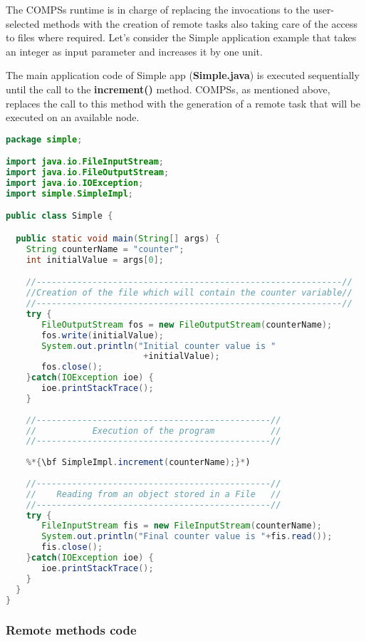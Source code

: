 The COMPSs runtime is in charge of replacing the invocations to the user-selected methods with the
creation of remote tasks also taking care of the access to files where required. 
Let's consider the Simple application example that takes an integer as input parameter and increases it by one unit.

The main application code of Simple app ({\bf Simple.java}) is executed sequentially until the call to the
{\bf increment()} method. COMPSs, as mentioned above, replaces the call to this method with the generation of a remote task that will be executed on an available node.

\begin{lstlisting}[language=java]
package simple;

import java.io.FileInputStream;
import java.io.FileOutputStream;
import java.io.IOException;
import simple.SimpleImpl;

public class Simple {

  public static void main(String[] args) {
    String counterName = "counter";
    int initialValue = args[0];

    //------------------------------------------------------------//
    //Creation of the file which will contain the counter variable//
    //------------------------------------------------------------//
    try {
       FileOutputStream fos = new FileOutputStream(counterName);
       fos.write(initialValue);
       System.out.println("Initial counter value is "
                           +initialValue);
       fos.close();
    }catch(IOException ioe) {
       ioe.printStackTrace();
    }
    
    //----------------------------------------------//
    //           Execution of the program           //
    //----------------------------------------------//
    
    %*{\bf SimpleImpl.increment(counterName);}*)
    
    //----------------------------------------------//
    //    Reading from an object stored in a File   //
    //----------------------------------------------//
    try {
       FileInputStream fis = new FileInputStream(counterName);
       System.out.println("Final counter value is "+fis.read());
       fis.close();
    }catch(IOException ioe) {
       ioe.printStackTrace();
    }
  }
}
\end{lstlisting}


\subsubsection{Remote methods code}


